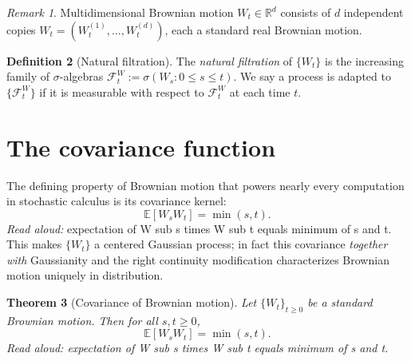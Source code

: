 \documentclass[11pt]{article}
\newtheorem{theorem}{Theorem}
\theoremstyle{definition}
\newtheorem{definition}[theorem]{Definition}
\theoremstyle{remark}
\newtheorem{remark}[theorem]{Remark}
\newcommand{\R}{\mathbb{R}}
\newcommand{\E}{\mathbb{E}}
\newcommand{\F}{\mathcal{F}}
\begin{document}
\begin{remark}
Multidimensional Brownian motion $W_t \in \R^d$ consists of $d$
independent copies $W_t = (W_t^{(1)}, \dots, W_t^{(d)})$, each a standard
real Brownian motion.
\end{remark}

\begin{definition}[Natural filtration]
The \emph{natural filtration} of $\{W_t\}$ is the increasing family of
$\sigma$-algebras $\F_t^W := \sigma(W_s : 0 \leq s \leq t)$. We say a
process is adapted to $\{\F_t^W\}$ if it is measurable with respect to
$\F_t^W$ at each time $t$.
\end{definition}

\section{The covariance function}

The defining property of Brownian motion that powers nearly every
computation in stochastic calculus is its covariance kernel:
$$\E[W_s W_t] = \min(s, t).$$
\emph{Read aloud:} expectation of W sub s times W sub t equals minimum of s and t.
This makes $\{W_t\}$ a centered Gaussian process; in fact this covariance
\emph{together with} Gaussianity and the right continuity modification
characterizes Brownian motion uniquely in distribution.

\begin{theorem}[Covariance of Brownian motion]\label{thm:cov}
Let $\{W_t\}_{t \geq 0}$ be a standard Brownian motion. Then for all
$s, t \geq 0$,
$$\E[W_s W_t] = \min(s, t).$$
\emph{Read aloud:} expectation of W sub s times W sub t equals minimum of s and t.
\end{theorem}
\end{document}
